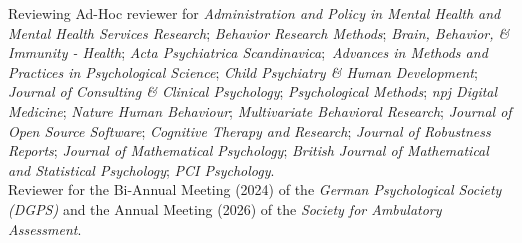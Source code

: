 \documentclass{resume} %
\begin{document}
\begin{rSection}{Reviewing}
Ad-Hoc reviewer for \textit{Administration and Policy in Mental Health and Mental Health Services Research}; \textit{Behavior Research Methods}; \textit{Brain, Behavior, \& Immunity - Health}; \textit{Acta Psychiatrica Scandinavica};\ \textit{Advances in Methods and Practices in Psychological Science}; \textit{Child Psychiatry \& Human Development}; \textit{Journal of Consulting \& Clinical Psychology}; \textit{Psychological Methods}; \textit{npj Digital Medicine}; \textit{Nature Human Behaviour}; \textit{Multivariate Behavioral Research}; \textit{Journal of Open Source Software}; \textit{Cognitive Therapy and Research}; \textit{Journal of Robustness Reports}; \textit{Journal of Mathematical Psychology}; \textit{British Journal of Mathematical and Statistical Psychology}; \textit{PCI Psychology}.\\
Reviewer for the Bi-Annual Meeting (2024) of the \textit{German Psychological Society (DGPS)} and the Annual Meeting (2026) of the \textit{Society for Ambulatory Assessment}.
\end{rSection}

\end{document}
